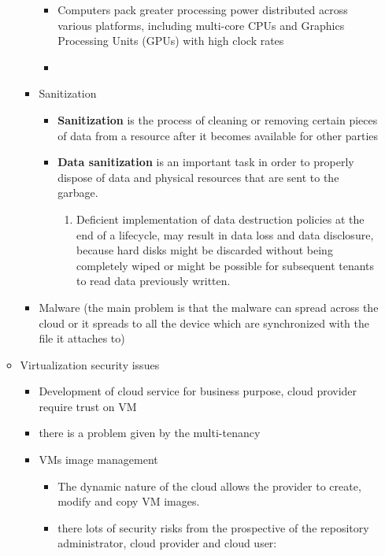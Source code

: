\documentclass{article}
\begin{document}
\begin{itemize}
\begin{itemize}
\begin{itemize}
\begin{itemize}
                \item  Computers pack greater processing power distributed across various platforms, including multi-core CPUs and Graphics Processing Units (GPUs) with high clock rates
                \item 
            \end{itemize}
            \item Sanitization
            \begin{itemize}
                \item \textbf{Sanitization} is the process of cleaning or removing certain pieces of data from a resource after it becomes available for other parties
                \item \textbf{Data sanitization} is an important task in order to properly dispose of data and physical resources that are sent to the garbage.
                \begin{enumerate}
                    \item Deficient implementation of data destruction policies at the end of a lifecycle, may result in data loss and data disclosure, because hard disks might be discarded without being completely wiped or  might be possible for subsequent tenants to read data previously written.
                \end{enumerate}
            \end{itemize}
            \item Malware (the main problem is that the malware can spread across the cloud or it spreads to all the device which are synchronized with the file it attaches to)
        \end{itemize}
        \item Virtualization security issues
        \begin{itemize}
            \item Development of cloud service for business purpose, cloud provider require trust on VM
            \item there is a problem given by the multi-tenancy
            \item VMs image management
            \begin{itemize}
                \item The dynamic nature of the cloud allows the provider to create, modify and copy VM images.
                \item there lots of security risks from the prospective of the repository administrator, cloud provider and cloud user:

\end{itemize}
\end{itemize}
\end{itemize}
\end{itemize}
\end{document}
